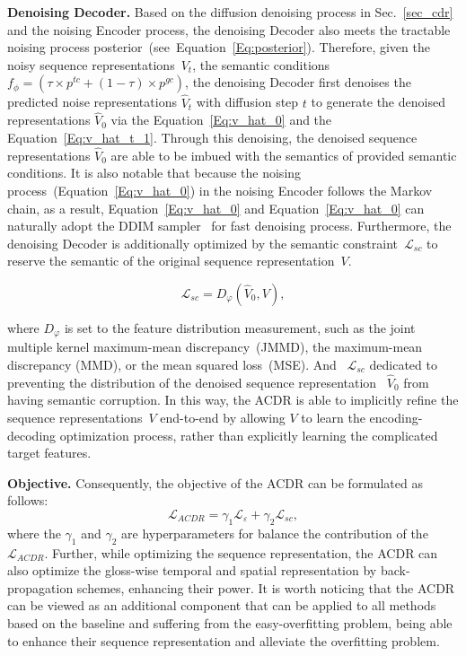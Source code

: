 \documentclass[sigconf]{acmart}
\begin{document}
\noindent \textbf{Denoising Decoder.}
Based on the diffusion denoising process in Sec.~\ref{sec_cdr} and the noising Encoder process, the denoising Decoder also meets the tractable noising process posterior~(see~Equation~\ref{Eq:posterior}).
Therefore, given the noisy sequence representations~$V_t$, the semantic conditions~$f_\phi= (\tau  \times p^{tc}+(1-\tau) \times p^{gc})$, the denoising Decoder first denoises the predicted noise representations $\widehat V_t$ with diffusion step $t$ to generate the denoised representations $\widehat V_0$ via the Equation~\ref{Eq:v_hat_0} and the Equation~\ref{Eq:v_hat_t_1}.
Through this denoising, the denoised sequence representations $\widehat V_0$ are able to be imbued with the semantics of provided semantic conditions.
It is also notable that because the noising process~(Equation~\ref{Eq:v_hat_0}) in the noising Encoder follows the Markov chain, as a result, Equation~\ref{Eq:v_hat_0} and Equation~\ref{Eq:v_hat_0} can naturally adopt the DDIM sampler~\cite{2021ddim} for fast denoising process.
Furthermore, the denoising Decoder is additionally optimized by the semantic constraint~$\mathcal{L}_{sc}$ to reserve the semantic of the original sequence representation~${V}$.

\begin{equation}
    \mathcal{L}_{sc} = {D_\varphi }\left( {{{\widehat V}_0},V} \right),
    \label{Eq:L_dc}
\end{equation}

\noindent where $D_\varphi$ is set to the feature distribution measurement, such as the joint multiple kernel maximum-mean discrepancy~(JMMD), the maximum-mean discrepancy (MMD), or the mean squared loss~(MSE).
And ~$\mathcal{L}_{sc}$ dedicated to preventing the distribution of the denoised sequence representation ~${\widehat V_0}$ from having semantic corruption.
In this way, the ACDR is able to implicitly refine the sequence representations~$V$ end-to-end by allowing $V$ to learn the encoding-decoding optimization process, rather than explicitly learning the complicated target features.

\noindent \textbf{Objective.}
Consequently, the objective of the ACDR can be formulated as follows:
\begin{equation}
    \mathcal{L}_{ACDR} = \gamma_1\mathcal{L}_\varepsilon + \gamma_2\mathcal{L}_{sc},
    \label{Eq:acdr}
\end{equation}
\noindent where the $\gamma_1$ and $\gamma_2$ are hyperparameters for balance the contribution of the~$\mathcal{L}_{ACDR}$. 
Further, while optimizing the sequence representation, the ACDR can also optimize the gloss-wise temporal and spatial representation by back-propagation schemes, enhancing their power.
It is worth noticing that the ACDR can be viewed as an additional component that can be applied to all methods based on the baseline and suffering from the easy-overfitting problem, being able to enhance their sequence representation and alleviate the overfitting problem.
\end{document}
